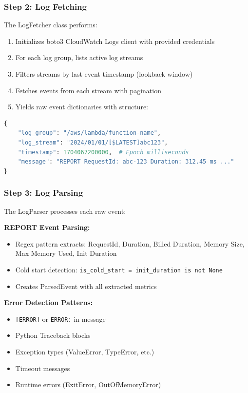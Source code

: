 \documentclass[12pt,a4paper]{article}
\begin{document}
\subsubsection{Step 2: Log Fetching}
The LogFetcher class performs:
\begin{enumerate}
    \item Initializes boto3 CloudWatch Logs client with provided credentials
    \item For each log group, lists active log streams
    \item Filters streams by last event timestamp (lookback window)
    \item Fetches events from each stream with pagination
    \item Yields raw event dictionaries with structure:
\end{enumerate}

\begin{lstlisting}[language=Python, caption=Raw Event Structure]
{
    "log_group": "/aws/lambda/function-name",
    "log_stream": "2024/01/01/[$LATEST]abc123",
    "timestamp": 1704067200000,  # Epoch milliseconds
    "message": "REPORT RequestId: abc-123 Duration: 312.45 ms ..."
}
\end{lstlisting}

\subsubsection{Step 3: Log Parsing}
The LogParser processes each raw event:

\bigskip
\noindent\textbf{REPORT Event Parsing:}
\begin{itemize}
    \item Regex pattern extracts: RequestId, Duration, Billed Duration, Memory Size, Max Memory Used, Init Duration
    \item Cold start detection: \texttt{is\_cold\_start = init\_duration is not None}
    \item Creates ParsedEvent with all extracted metrics
\end{itemize}

\bigskip
\noindent\textbf{Error Detection Patterns:}
\begin{itemize}
    \item \texttt{[ERROR]} or \texttt{ERROR:} in message
    \item Python Traceback blocks
    \item Exception types (ValueError, TypeError, etc.)
    \item Timeout messages
    \item Runtime errors (ExitError, OutOfMemoryError)
\end{itemize}
\end{document}
